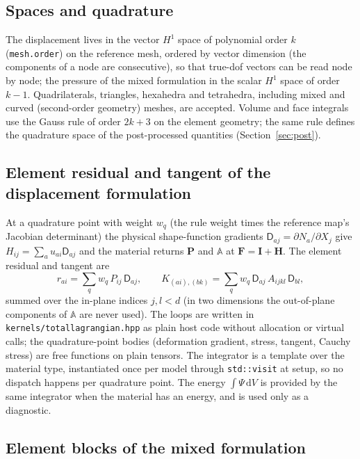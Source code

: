 \documentclass[11pt]{article}
\newcommand{\ud}{\,\mathrm{d}}
\newcommand{\bP}{\bm{P}}
\newcommand{\bF}{\bm{F}}
\newcommand{\bI}{\bm{I}}
\newcommand{\bH}{\bm{H}}
\newcommand{\bA}{\mathbb{A}}
\DeclareRobustCommand{\code}[1]{{\def\_{\textunderscore\allowbreak}\texttt{#1}}}
\DeclareRobustCommand{\file}[1]{{\def\_{\textunderscore\allowbreak}\texttt{#1}}}
\begin{document}
\subsection{Spaces and quadrature}

The displacement lives in the vector $H^1$ space of polynomial order $k$
(\code{mesh.order}) on the reference mesh, ordered by vector dimension
(the components of a node are consecutive), so that true-dof vectors can be
read node by node; the pressure of the mixed formulation in the scalar
$H^1$ space of order $k-1$.  Quadrilaterals, triangles, hexahedra and
tetrahedra, including mixed and curved (second-order geometry) meshes, are
accepted.  Volume and face integrals use the Gauss rule of order $2k + 3$
on the element geometry; the same rule defines the quadrature space of the
post-processed quantities (Section~\ref{sec:post}).

\subsection{Element residual and tangent of the displacement formulation}

At a quadrature point with weight $w_q$ (the rule weight times the
reference map's Jacobian determinant) the physical shape-function gradients
$\mathsf{D}_{aj} = \partial N_a/\partial X_j$ give
$H_{ij} = \sum_a u_{ai}\mathsf{D}_{aj}$ and the material returns $\bP$ and
$\bA$ at $\bF = \bI + \bH$.  The element residual and tangent are
\begin{equation}
  r_{ai} = \sum_q w_q\,P_{ij}\,\mathsf{D}_{aj},
  \qquad
  K_{(ai),(bk)} = \sum_q w_q\,\mathsf{D}_{aj}\,A_{ijkl}\,\mathsf{D}_{bl},
  \label{eq:element}
\end{equation}
summed over the in-plane indices $j, l < d$ (in two dimensions the
out-of-plane components of $\bA$ are never used).  The loops are written in
\file{kernels/total\_lagrangian.hpp} as plain host code without allocation
or virtual calls; the quadrature-point bodies (deformation gradient,
stress, tangent, Cauchy stress) are free functions on plain tensors.  The
integrator is a template over the material type, instantiated once per
model through \code{std::visit} at setup, so no dispatch happens per
quadrature point.  The energy $\int\Psi\ud V$ is provided by the same
integrator when the material has an energy, and is used only as a
diagnostic.

\subsection{Element blocks of the mixed formulation}
\end{document}
